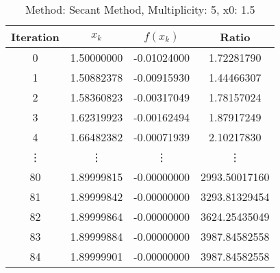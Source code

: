\begin{table}
\centering
\caption{Method: Secant Method, Multiplicity: 5, x0: 1.5}
\label{tab:table_Secant_Method_5_1_5}
\begin{tabular}{c c c c}
\toprule
Iteration &      $x_k$ &    $f(x_k)$ &         Ratio \\
\midrule
        0 & 1.50000000 & -0.01024000 &    1.72281790 \\
        1 & 1.50882378 & -0.00915930 &    1.44466307 \\
        2 & 1.58360823 & -0.00317049 &    1.78157024 \\
        3 & 1.62319923 & -0.00162494 &    1.87917249 \\
        4 & 1.66482382 & -0.00071939 &    2.10217830 \\
   \vdots &     \vdots &      \vdots &        \vdots \\
       80 & 1.89999815 & -0.00000000 & 2993.50017160 \\
       81 & 1.89999842 & -0.00000000 & 3293.81329454 \\
       82 & 1.89999864 & -0.00000000 & 3624.25435049 \\
       83 & 1.89999884 & -0.00000000 & 3987.84582558 \\
       84 & 1.89999901 & -0.00000000 & 3987.84582558 \\
\bottomrule
\end{tabular}
\end{table}
